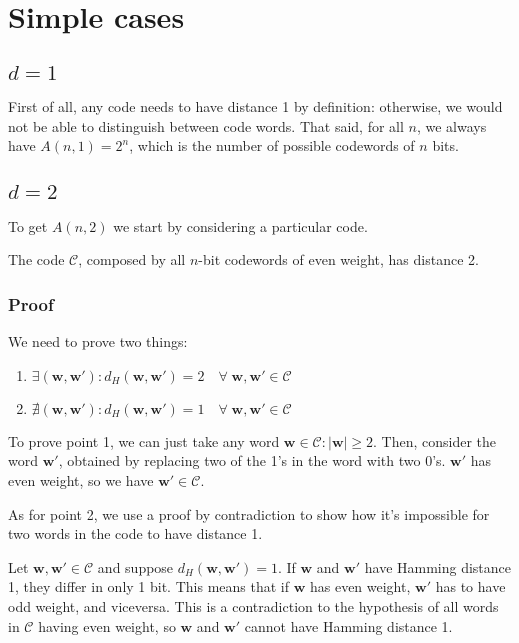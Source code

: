 \section{Simple cases}
\subsection*{$d=1$}
First of all, any code needs to have distance 1 by definition: otherwise, we would not be able to distinguish between code words. That said, for all $n$, we always have $A(n,1) = 2^n$, which is the number of possible codewords of $n$ bits.

\subsection*{$d=2$}
To get $A(n,2)$ we start by considering a particular code.
\begin{lemma}
    The code $\mathcal{C}$, composed by all $n$-bit codewords of even weight, has distance 2.
\end{lemma}
\subsubsection*{Proof}
We need to prove two things:
\begin{enumerate}
    \item $\exists (\mathbf{w},\mathbf{w}') : d_H(\mathbf{w},\mathbf{w}')=2\quad\forall\; \mathbf{w},\mathbf{w}' \in \mathcal{C}$
    \item $\nexists (\mathbf{w},\mathbf{w}') : d_H(\mathbf{w},\mathbf{w}')=1\quad\forall\; \mathbf{w},\mathbf{w}' \in \mathcal{C}$
\end{enumerate}

To prove point 1, we can just take any word $\mathbf{w}\in \mathcal{C}:|\mathbf{w}|\geq 2$. Then, consider the word $\mathbf{w}'$, obtained by replacing two of the 1's in the word with two 0's.
$\mathbf{w}'$ has even weight, so we have $\mathbf{w}' \in \mathcal{C}$.

As for point 2, we use a proof by contradiction to show how it's impossible for two words in the code to have distance 1.

Let $\mathbf{w},\mathbf{w}' \in \mathcal{C}$ and suppose $d_H(\mathbf{w},\mathbf{w}')=1$. If $\mathbf{w}$ and $\mathbf{w}'$ have Hamming distance 1, they differ in only 1 bit.
This means that if $\mathbf{w}$ has even weight, $\mathbf{w}'$ has to have odd weight, and viceversa. This is a contradiction to the hypothesis of all words in $\mathcal{C}$ having even weight, so $\mathbf{w}$ and $\mathbf{w}'$ cannot have Hamming distance 1.

